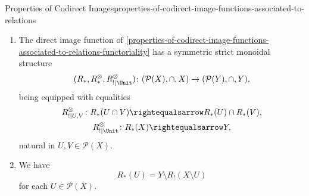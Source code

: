 \begin{proposition}{Properties of Codirect Images}{properties-of-codirect-image-functions-associated-to-relations}
\begin{enumerate}
\[\begin{gathered}
                    R^{\otimes}_{!|\Unit} \colon \emptyset               \subset R_{*}(\emptyset),
                \end{gathered}
            \]%
            natural in $U,V\in\mathcal{P}(X)$.
        \item\label{properties-of-codirect-image-functions-associated-to-relations-symmetric-strict-monoidality-with-respect-to-intersections}The direct image function of \cref{properties-of-codirect-image-functions-associated-to-relations-functoriality} has a symmetric strict monoidal structure
            \[
                (R_{*},R^{\otimes}_{*},R^{\otimes}_{!|\Unit})
                \colon
                (\mathcal{P}(X),\cap,X)
                \to
                (\mathcal{P}(Y),\cap,Y),
            \]%
            being equipped with equalities%
            \[
                \begin{gathered}
                    R^{\otimes}_{!|U,V}   \colon R_{*}(U\cap V) \rightequalsarrow R_{*}(U)\cap R_{*}(V),\\
                    R^{\otimes}_{!|\Unit} \colon R_{*}(X)       \rightequalsarrow Y,
                \end{gathered}
            \]%
            natural in $U,V\in\mathcal{P}(X)$.
        \item\label{properties-of-codirect-image-functions-associated-to-relations-relation-to-direct-images}We have
            \[
                R_{*}(U)%
                =%
                Y\setminus R_{!}(X\setminus U)
            \]%
            for each $U\in\mathcal{P}(X)$.
    \end{enumerate}
\end{proposition}
